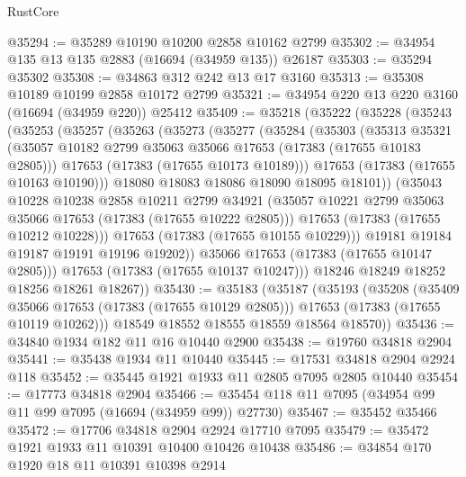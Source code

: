 \begin{lexlean}{RustCore}
\begin{coremodule}
@35294 := @35289 @10190 @10200 @2858 @10162 @2799
@35302 := @34954 @135 @13 @135 @2883 (@16694 (@34959 @135)) @26187
@35303 := @35294 @35302
@35308 := @34863 @312 @242 @13 @17 @3160
@35313 := @35308 @10189 @10199 @2858 @10172 @2799
@35321 := @34954 @220 @13 @220 @3160 (@16694 (@34959 @220)) @25412
@35409 := @35218
    (@35222
      (@35228
        (@35243
          (@35253
            (@35257
              (@35263
                (@35273
                  (@35277
                    (@35284
                      (@35303
                        (@35313
                          @35321
                          (@35057 @10182 @2799 @35063 @35066 @17653 (@17383 (@17655 @10183 @2805)))
                          @17653
                          (@17383 (@17655 @10173 @10189)))
                        @17653
                        (@17383 (@17655 @10163 @10190)))
                      @18080
                      @18083
                      @18086
                      @18090
                      @18095
                      @18101))
                  (@35043
                    @10228
                    @10238
                    @2858
                    @10211
                    @2799
                    @34921
                    (@35057 @10221 @2799 @35063 @35066 @17653 (@17383 (@17655 @10222 @2805)))
                    @17653
                    (@17383 (@17655 @10212 @10228)))
                  @17653
                  (@17383 (@17655 @10155 @10229)))
                @19181
                @19184
                @19187
                @19191
                @19196
                @19202))
            @35066
            @17653
            (@17383 (@17655 @10147 @2805)))
          @17653
          (@17383 (@17655 @10137 @10247)))
        @18246
        @18249
        @18252
        @18256
        @18261
        @18267))
@35430 := @35183
    (@35187
      (@35193
        (@35208
          (@35409 @35066 @17653 (@17383 (@17655 @10129 @2805)))
          @17653
          (@17383 (@17655 @10119 @10262)))
        @18549
        @18552
        @18555
        @18559
        @18564
        @18570))
@35436 := @34840 @1934 @182 @11 @16 @10440 @2900
@35438 := @19760 @34818 @2904
@35441 := @35438 @1934 @11 @10440
@35445 := @17531 @34818 @2904 @2924 @118
@35452 := @35445 @1921 @1933 @11 @2805 @7095 @2805 @10440
@35454 := @17773 @34818 @2904
@35466 := @35454 @118 @11 @7095 (@34954 @99 @11 @99 @7095 (@16694 (@34959 @99)) @27730)
@35467 := @35452 @35466
@35472 := @17706 @34818 @2904 @2924 @17710 @7095
@35479 := @35472 @1921 @1933 @11 @10391 @10400 @10426 @10438
@35486 := @34854 @170 @1920 @18 @11 @10391 @10398 @2914

\end{coremodule}
\end{lexlean}

